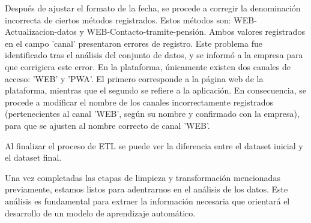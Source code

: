 Después de ajustar el formato de la fecha, se procede a corregir la denominación incorrecta de ciertos métodos registrados. Estos métodos son: WEB-Actualizacion-datos y WEB-Contacto-tramite-pensión. Ambos valores registrados en el campo 'canal' presentaron errores de registro. Este problema fue identificado tras el análisis del conjunto de datos, y se informó a la empresa para que corrigiera este error. En la plataforma, únicamente existen dos canales de acceso: 'WEB' y 'PWA'. El primero corresponde a la página web de la plataforma, mientras que el segundo se refiere a la aplicación. En consecuencia, se procede a modificar el nombre de los canales incorrectamente registrados (pertenecientes al canal 'WEB', según su nombre y confirmado con la empresa), para que se ajusten al nombre correcto de canal 'WEB'.

Al finalizar el proceso de ETL se puede ver la diferencia entre el dataset inicial y el dataset final.


Una vez completadas las etapas de limpieza y transformación mencionadas previamente, estamos listos para adentrarnos en el análisis de los datos. Este análisis es fundamental para extraer la información necesaria que orientará el desarrollo de un modelo de aprendizaje automático.